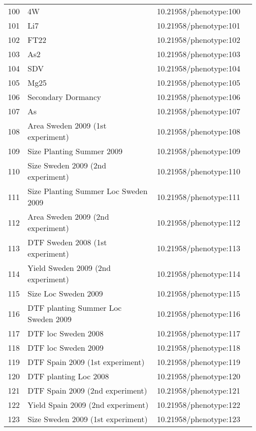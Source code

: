 \begin{longtable}{p{} p{} p{} p{}}
 100 & 4W & 10.21958/phenotype:100 & \cite{atwell2010}\\
 101 & Li7 & 10.21958/phenotype:101 & \cite{atwell2010}\\
 102 & FT22 & 10.21958/phenotype:102 & \cite{atwell2010}\\
 103 & As2 & 10.21958/phenotype:103 & \cite{atwell2010}\\
 104 & SDV & 10.21958/phenotype:104 & \cite{atwell2010}\\
 105 & Mg25 & 10.21958/phenotype:105 & \cite{atwell2010}\\
 106 & Secondary Dormancy & 10.21958/phenotype:106 & \cite{atwell2010}\\
 107 & As & 10.21958/phenotype:107 & \cite{atwell2010}\\
 108 & Area Sweden 2009 (1st experiment) & 10.21958/phenotype:108 & \cite{li2010}\\
 109 & Size Planting Summer 2009 & 10.21958/phenotype:109 & \cite{li2010}\\
 110 & Size Sweden 2009 (2nd experiment) & 10.21958/phenotype:110 & \cite{li2010}\\
 111 & Size Planting Summer Loc Sweden 2009 & 10.21958/phenotype:111 & \cite{li2010}\\
 112 & Area Sweden 2009 (2nd experiment) & 10.21958/phenotype:112 & \cite{li2010}\\
 113 & DTF Sweden 2008 (1st experiment) & 10.21958/phenotype:113 & \cite{li2010}\\
 114 & Yield Sweden 2009 (2nd experiment) & 10.21958/phenotype:114 & \cite{li2010}\\
 115 & Size Loc Sweden 2009 & 10.21958/phenotype:115 & \cite{li2010}\\
 116 & DTF planting Summer Loc Sweden 2009 & 10.21958/phenotype:116 & \cite{li2010}\\
 117 & DTF loc Sweden 2008 & 10.21958/phenotype:117 & \cite{li2010}\\
 118 & DTF loc Sweden 2009 & 10.21958/phenotype:118 & \cite{li2010}\\
 119 & DTF Spain 2009 (1st experiment) & 10.21958/phenotype:119 & \cite{li2010}\\
 120 & DTF planting Loc 2008 & 10.21958/phenotype:120 & \cite{li2010}\\
 121 & DTF Spain 2009 (2nd experiment) & 10.21958/phenotype:121 & \cite{li2010}\\
 122 & Yield Spain 2009 (2nd experiment) & 10.21958/phenotype:122 & \cite{li2010}\\
 123 & Size Sweden 2009 (1st experiment) & 10.21958/phenotype:123 & \cite{li2010}\\

\end{longtable}
